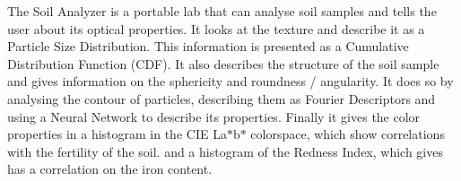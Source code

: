 The Soil Analyzer is a portable lab that can analyse soil samples and tells the user about it\textquotesingle{}s optical properties. It looks at the texture and describe it as a Particle Size Distribution. This information is presented as a Cumulative Distribution Function (C\+D\+F). It also describes the structure of the soil sample and gives information on the sphericity and roundness / angularity. It does so by analysing the contour of particles, describing them as Fourier Descriptors and using a Neural Network to describe it\textquotesingle{}s properties. Finally it gives the color properties in a histogram in the C\+I\+E La$\ast$b$\ast$ colorspace, which show correlations with the fertility of the soil. and a histogram of the Redness Index, which gives has a correlation on the iron content. 